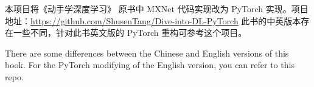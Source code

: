 本项目将《动手学深度学习》 原书中 MXNet 代码实现改为 PyTorch 实现。项目地址：\href{https://github.com/ShusenTang/Dive-into-DL-PyTorch}{https://github.com/ShusenTang/Dive-into-DL-PyTorch} 此书的中英版本存在一些不同，针对此书英文版的 PyTorch 重构可参考这个项目。 
    
There are some differences between the Chinese and English versions of this book. For the PyTorch modifying of the English version, you can refer to this repo.

\thispagestyle{empty}